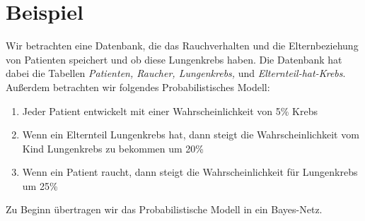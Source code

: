 \documentclass[german,version-2020-11]{uzl-thesis}
\begin{document}
\section{Beispiel}
Wir betrachten eine Datenbank, die das Rauchverhalten und die Elternbeziehung von Patienten speichert und ob diese Lungenkrebs haben. Die Datenbank hat dabei die Tabellen \textit{Patienten, Raucher, Lungenkrebs, } und \textit{Elternteil-hat-Krebs}. Außerdem betrachten wir folgendes Probabilistisches Modell: 
\begin{enumerate}
\item Jeder Patient entwickelt mit einer Wahrscheinlichkeit von 5\% Krebs
\item Wenn ein Elternteil Lungenkrebs hat, dann steigt die Wahrscheinlichkeit vom Kind Lungenkrebs zu bekommen um 20\%
\item Wenn ein Patient raucht, dann steigt die Wahrscheinlichkeit für Lungenkrebs um 25\%
\end{enumerate}
Zu Beginn übertragen wir das Probabilistische Modell in ein Bayes-Netz.  \\
\end{document}
